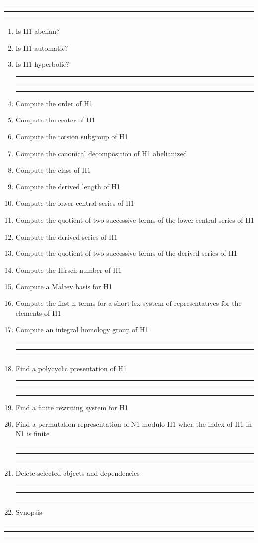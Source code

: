 
\bigskip
\hrule\hrule\hrule

\begin{enumerate}

\item Is H1 abelian?

\item Is H1 automatic?

\item Is H1 hyperbolic?

\bigskip
\hrule\hrule\hrule

\item Compute the order of H1

\item Compute the center of H1

\item Compute the torsion subgroup of H1

\item Compute the canonical decomposition of H1 abelianized

\item Compute the class of H1

\item Compute the derived length of H1

\item Compute the lower central series of H1

\item Compute the quotient of two successive terms of the lower central
series of H1

\item Compute the derived series of H1

\item Compute the quotient of two successive terms of the derived series
of H1

\item Compute the Hirsch number of H1

\item Compute a Malcev basis for H1

\item Compute the first n terms for a short-lex system of representatives for the
elements of H1

\item Compute an integral homology group of H1

\bigskip
\hrule\hrule\hrule

\item Find a polycyclic presentation of H1

\bigskip
\hrule\hrule\hrule

\item Find a finite rewriting system for H1

\item Find a permutation representation of N1 modulo H1 when the
index of H1 in N1 is finite

\bigskip
\hrule\hrule\hrule

\item Delete selected objects and dependencies
\bigskip
\hrule\hrule\hrule
\item Synopsis
\end{enumerate}

\bigskip
\hrule\hrule\hrule
